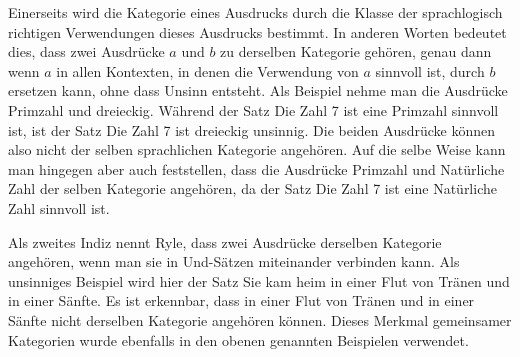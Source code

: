 \documentclass[a4paper]{article}
\begin{document}
Einerseits wird die Kategorie eines Ausdrucks durch die Klasse der sprachlogisch richtigen Verwendungen dieses Ausdrucks bestimmt. In anderen Worten bedeutet dies, dass zwei Ausdrücke \(a\) und \(b\) zu derselben Kategorie gehören, genau dann wenn \(a\) in allen Kontexten, in denen die Verwendung von \(a\) sinnvoll ist, durch \(b\) ersetzen kann, ohne dass Unsinn entsteht. Als Beispiel nehme man die Ausdrücke Primzahl und dreieckig. Während der Satz Die Zahl 7 ist eine Primzahl sinnvoll ist, ist der Satz Die Zahl 7 ist dreieckig unsinnig. Die beiden Ausdrücke können also nicht der selben sprachlichen Kategorie angehören. Auf die selbe Weise kann man hingegen aber auch feststellen, dass die Ausdrücke Primzahl und Natürliche Zahl der selben Kategorie angehören, da der Satz Die Zahl 7 ist eine Natürliche Zahl sinnvoll ist.

Als zweites Indiz nennt Ryle, dass zwei Ausdrücke derselben Kategorie angehören, wenn man sie in Und-Sätzen miteinander verbinden kann. Als unsinniges Beispiel wird hier der Satz Sie kam heim in einer Flut von Tränen und in einer Sänfte. Es ist erkennbar, dass in einer Flut von Tränen und in einer Sänfte nicht derselben Kategorie angehören können. Dieses Merkmal gemeinsamer Kategorien wurde ebenfalls in den obenen genannten Beispielen verwendet.
\end{document}
